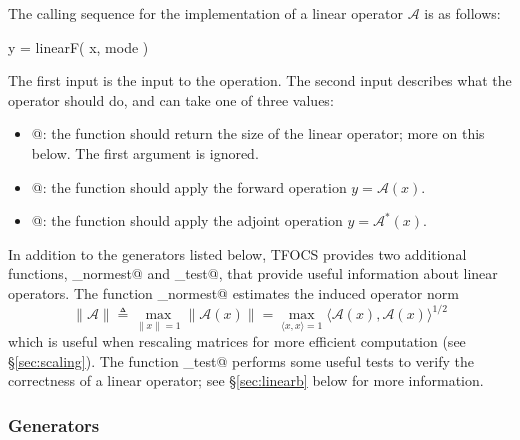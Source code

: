 \documentclass{article}
\newcommand{\cA}{\ensuremath{\mathcal{A}}}    %
\newcommand{\<}{\langle}
\renewcommand{\>}{\rangle}
\begin{document}
The calling sequence for the implementation \verb@linearF@ of a linear operator $\cA$ is as follows:
\begin{code}
	y = linearF( x, mode )
\end{code}
The first input \verb@x@ is the input to the operation. The 
second input \verb@mode@ describes what the operator should do,
and can take one of three values:
\begin{itemize}
\item {}@: the function should return the size of
the linear operator; more on this below. The first argument \verb@x@ is ignored.
\item {}@: the function should apply the forward operation $y=\cA(x)$.
\item {}@: the function should apply the adjoint operation $y=\cA^*(x)$.
\end{itemize}

In addition to the generators listed below, TFOCS provides two additional
functions, \verb@linop_normest@ and \verb@linop_test@, that provide useful
information about linear operators.
The function \verb@linop_normest@ estimates the induced operator norm 
\begin{equation}
	\| \cA \| \triangleq \max_{\|x\|=1} \|\cA(x)\| = \max_{\<x,x\>=1} \< \cA(x),\cA(x)\>^{1/2}
\end{equation}
which is useful when rescaling matrices for more efficient computation (see
\S\ref{sec:scaling}). The function \verb@linop_test@ performs some useful
tests to verify the correctness of a linear operator; see \S\ref{sec:linearb}
below for more information.

\subsubsection{Generators}
\end{document}
